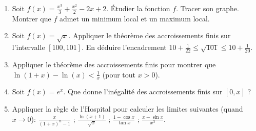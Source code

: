 \documentclass[class=report,crop=false]{standalone}
\begin{document}
\begin{miniexercices}
\sauteligne
\begin{enumerate}
  \item Soit $f(x) = \frac{x^3}{3}+\frac{x^2}{2}-2x+2$. \'Etudier la fonction $f$. Tracer son graphe.
Montrer que $f$ admet un minimum local et un maximum local.

   \item Soit $f(x)=\sqrt{x}$. Appliquer le théorème des accroissements finis sur l'intervalle $[100,101]$.
En déduire l'encadrement $10+\frac{1}{22} \le \sqrt{101} \le 10 + \frac{1}{20}$.

  \item Appliquer le théorème des accroissements finis pour montrer que $\ln (1+x)-\ln(x) < \frac 1x$ (pour tout $x>0$).

  \item Soit $f(x) = e^x$. Que donne l'inégalité des accroissements finis sur $[0,x]$ ?

  \item Appliquer la règle de l'Hospital pour calculer les limites suivantes (quand $x\to 0$):
$\displaystyle \frac{x}{(1+x)^n-1}$ ; $\displaystyle \frac{\ln(x+1)}{\sqrt x}$ ;
$\displaystyle \frac{1-\cos x}{\tan x}$ ; $\displaystyle \frac{x-\sin x}{x^3}$.
\end{enumerate}
\end{miniexercices}



\finchapitre
\end{document}
